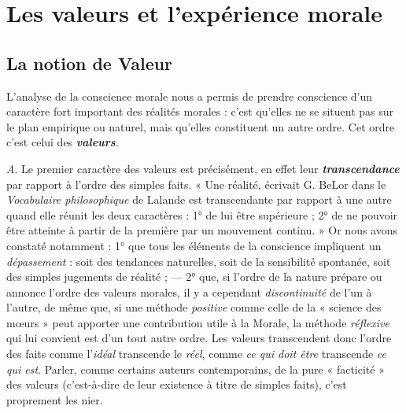
\section{Les valeurs et l'expérience morale}
\subsection{La notion de Valeur}
L'analyse de la conscience morale
nous a permis de prendre conscience d’un caractère fort important des
réalités morales : c’est qu’elles ne se situent pas sur le plan empirique
ou naturel, mais qu’elles constituent un autre ordre. Cet ordre
c’est celui des \textbf{\textit {valeurs}}.

{\it A}. Le premier caractère des valeurs est précisément, en effet
leur \textbf{\textit {transcendance}} par rapport à l’ordre des simples faits. « Une réalité,
écrivait G. BeLor dans le {\it Vocabulaire philosophique} de Lalande
est transcendante par rapport à une autre quand elle réunit les deux
caractères : 1° de lui être supérieure ; 2° de ne pouvoir être atteinte à
partir de la première par un mouvement continu. » Or nous avons
constaté notamment : 1° que tous les éléments de la conscience
impliquent un {\it dépassement} : soit des tendances naturelles, soit de la
sensibilité spontanée, soit des simples jugements de réalité ; — 2° que,
si l’ordre de la nature prépare ou annonce l’ordre des valeurs morales,
il y a cependant {\it discontinuité} de l’un à l’autre, de même que, si une
méthode {\it positive} comme celle de la « science des mœurs » peut
apporter une contribution utile à la Morale, la méthode {\it réflexive} qui
lui convient est d’un tout autre ordre. Les valeurs transcendent donc
l’ordre des faits comme l'{\it idéal} transcende le {\it réel}, comme {\it ce qui doit
être} transcende {\it ce qui est}. Parler, comme certains auteurs contemporains,
de la pure « facticité » des valeurs (c’est-à-dire de leur existence
à titre de simples faits), c’est proprement les nier.

